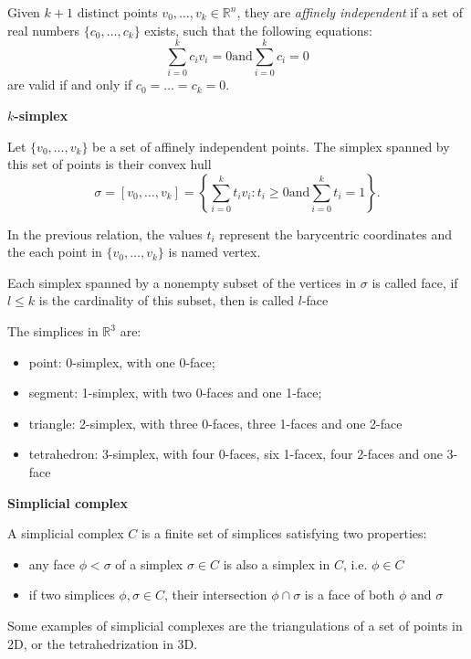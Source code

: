 Given $k + 1$ distinct points $v_0, \dots, v_k \in \mathbb{R}^n$, they are \emph{affinely independent} if a set of real numbers $\{c_0, \dots, c_k \}$ exists, such that the following equations:
\[
\sum_{i=0}^k{c_i v_i} = 0 \text{and} \sum_{i=0}^k{c_i} = 0
\]
are valid if and only if   $c_0 = \dots = c_k = 0$.


\begin{mydef}
 \textbf{$k$-simplex} 
 
 Let $\{v_0, \dots, v_k\}$ be a set of affinely independent points. The simplex spanned by this set of points is their convex hull
 \[
 \sigma = [v_0, \dots, v_k] = \left\{ \sum_{i=0}^{k}{t_i v_i} : t_i \geq 0 \text{and}  \sum_{i=0}^{k}{t_i} = 1\right\}.
 \]
\end{mydef}
In the previous relation, the values $t_i$ represent the barycentric coordinates and the each point in $\{v_0, \dots, v_k\}$ is named vertex.

Each simplex spanned by a nonempty subset of the vertices in $\sigma$ is called face, if $l\leq k$ is the cardinality of this subset, then is called $l$-face

The simplices in $\mathbb{R}^3$ are:
\begin{itemize}
  \item point: 0-simplex, with one 0-face;
  \item segment: 1-simplex, with two 0-faces and one 1-face;
  \item triangle: 2-simplex, with three 0-faces, three 1-faces and one 2-face
  \item tetrahedron: 3-simplex, with four 0-faces, six 1-facex, four 2-faces and one 3-face
\end{itemize}

\begin{mydef}
\textbf{Simplicial complex}

A simplicial complex $C$ is a finite set of simplices satisfying two properties:
\begin{itemize}
  \item any face $\phi < \sigma$ of a simplex $\sigma \in C$ is also a simplex in $C$, i.e. $\phi \in C$
  \item if two simplices $\phi, \sigma \in C$, their intersection $\phi \cap \sigma$ is a face of both $\phi$ and $\sigma$
\end{itemize}
\end{mydef}
Some examples of simplicial complexes are the triangulations of a set of points in 2D, or the tetrahedrization in 3D.

